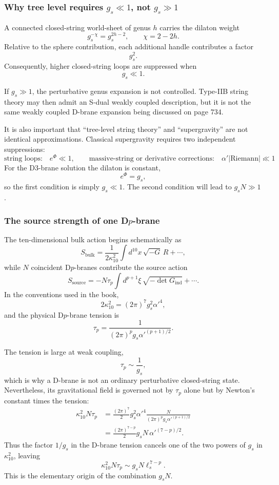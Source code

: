 \documentclass[
  10pt,
  a4paper,
  openany]{book}
\begin{document}
\subsubsection{\texorpdfstring{Why tree level requires \(g_s\ll1\), not
\(g_s\gg1\)}{Why tree level requires g\_s\textbackslash ll1, not g\_s\textbackslash gg1}}\label{why-tree-level-requires-g_sll1-not-g_sgg1}

A connected closed-string world-sheet of genus \(h\) carries the dilaton
weight \[
g_s^{-\chi}
=g_s^{2h-2},
\qquad
\chi=2-2h.
\] Relative to the sphere contribution, each additional handle
contributes a factor \[
g_s^2.
\] Consequently, higher closed-string loops are suppressed when \[
\boxed{
g_s\ll1
}.
\]

If \(g_s\gg1\), the perturbative genus expansion is not controlled.
Type-IIB string theory may then admit an S-dual weakly coupled
description, but it is not the same weakly coupled D-brane expansion
being discussed on page 734.

It is also important that ``tree-level string theory'' and
``supergravity'' are not identical approximations. Classical
supergravity requires two independent suppressions: \[
\boxed{
\text{string loops:}\quad e^\Phi\ll1,
\qquad
\text{massive-string or derivative corrections:}\quad
\alpha'|\mathrm{Riemann}|\ll1
}.
\] For the D3-brane solution the dilaton is constant, \[
e^\Phi=g_s,
\] so the first condition is simply \(g_s\ll1\). The second condition
will lead to \(g_sN\gg1\).

\subsubsection{\texorpdfstring{The source strength of one
D\(p\)-brane}{The source strength of one Dp-brane}}\label{the-source-strength-of-one-dp-brane}

The ten-dimensional bulk action begins schematically as \[
S_{\mathrm{bulk}}
=\frac1{2\kappa_{10}^2}
\int d^{10}x\,\sqrt{-G}\,R+\cdots,
\] while \(N\) coincident D\(p\)-branes contribute the source action \[
S_{\mathrm{source}}
=-N\tau_p
\int d^{p+1}\xi\,
\sqrt{-\det G_{\mathrm{ind}}}
+\cdots.
\] In the conventions used in the book, \[
2\kappa_{10}^2
=(2\pi)^7g_s^2\alpha'^4,
\] and the physical D\(p\)-brane tension is \[
\tau_p
=\frac1{(2\pi)^pg_s\alpha'^{(p+1)/2}}.
\]

The tension is large at weak coupling, \[
\tau_p\sim\frac1{g_s},
\] which is why a D-brane is not an ordinary perturbative closed-string
state. Nevertheless, its gravitational field is governed not by
\(\tau_p\) alone but by Newton's constant times the tension: \[
\begin{aligned}
\kappa_{10}^2N\tau_p
&=
\frac{(2\pi)^7}{2}
g_s^2\alpha'^4
\frac{N}{(2\pi)^pg_s\alpha'^{(p+1)/2}}\\
&=
\frac{(2\pi)^{7-p}}2
g_sN\,
\alpha'^{(7-p)/2}.
\end{aligned}
\] Thus the factor \(1/g_s\) in the D-brane tension cancels one of the
two powers of \(g_s\) in \(\kappa_{10}^2\), leaving \[
\boxed{
\kappa_{10}^2N\tau_p
\sim
g_sN\ell_s^{\,7-p}
}.
\] This is the elementary origin of the combination \(g_sN\).
\end{document}
